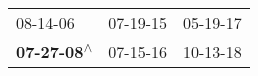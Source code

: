 \begin{supertabular}{lll}
                  08-14-06\textsuperscript{} &  07-19-15\textsuperscript{} &  05-19-17\textsuperscript{} \\
 \textbf{07-27-08\textsuperscript{$\wedge$}} &  07-15-16\textsuperscript{} &  10-13-18\textsuperscript{} \\
\end{supertabular}
